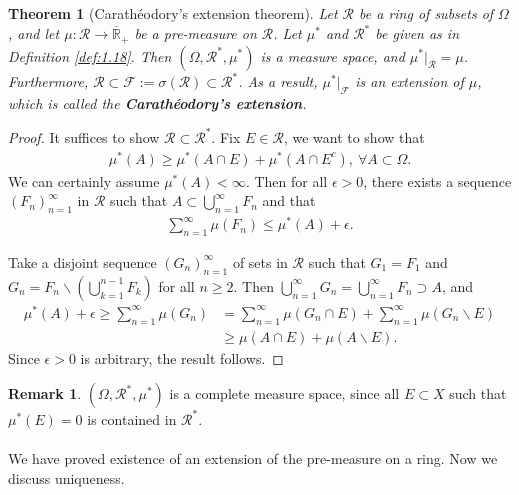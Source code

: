 \documentclass{article}
\numberwithin{equation}{section}
\theoremstyle{plain}
\newtheorem{theorem}{Theorem}[section]
\theoremstyle{definition}
\newtheorem*{remark}{Remark}
\begin{document}
\begin{theorem}[Carathéodory's extension theorem]\label{thm:1.21} Let $\mathscr{R}$ be a ring of subsets of $\Omega$, and let $\mu:\mathscr{R}\to\overline{\mathbb{R}}_+$ be a pre-measure on $\mathscr{R}$. Let $\mu^*$ and $\mathscr{R}^*$ be given as in Definition \ref{def:1.18}. Then $(\Omega,\mathscr{R}^*,\mu^*)$ is a measure space, and $\mu^*|_\mathscr{R}=\mu$. Furthermore, $\mathscr{R}\subset\mathscr{F}:=\sigma(\mathscr{R})\subset\mathscr{R}^*$. As a result, $\mu^*|_\mathscr{F}$ is an extension of $\mu$, which is called the \textbf{Carathéodory's extension}.
\end{theorem}
\begin{proof}
It suffices to show $\mathscr{R}\subset\mathscr{R}^*$. Fix $E\in\mathscr{R}$, we want to show that
\begin{align*}
	\mu^*(A)\geq\mu^*(A\cap E) + \mu^*(A\cap E^c),\ \forall A\subset\Omega.
\end{align*}
We can certainly assume $\mu^*(A)<\infty$. Then for all $\epsilon>0$, there exists a sequence $(F_n)_{n=1}^\infty$ in $\mathscr{R}$ such that $A\subset\bigcup_{n=1}^\infty F_n$ and that
\begin{align*}
	\sum_{n=1}^\infty\mu(F_n)\leq\mu^*(A)+\epsilon.
\end{align*}

Take a disjoint sequence $(G_n)_{n=1}^\infty$ of sets in $\mathscr{R}$ such that $G_1=F_1$ and $G_n=F_n\backslash\left(\bigcup_{k=1}^{n-1}F_k\right)$ for all $n\geq 2$. Then $\bigcup_{n=1}^\infty G_n = \bigcup_{n=1}^\infty F_n\supset A$, and
\begin{align*}
	\mu^*(A)+\epsilon\geq\sum_{n=1}^\infty\mu(G_n) &= \sum_{n=1}^\infty\mu(G_n\cap E) + \sum_{n=1}^\infty\mu(G_n\backslash E)\\
	&\geq \mu(A\cap E) + \mu(A\backslash E).
\end{align*}
Since $\epsilon>0$ is arbitrary, the result follows.
\end{proof}
\begin{remark}
$(\Omega,\mathscr{R}^*,\mu^*)$ is a complete measure space, since all $E\subset X$ such that $\mu^*(E)=0$ is contained in $\mathscr{R}^*$.
\end{remark}

\paragraph{} We have proved existence of an extension of the pre-measure on a ring. Now we discuss uniqueness.
\end{document}
